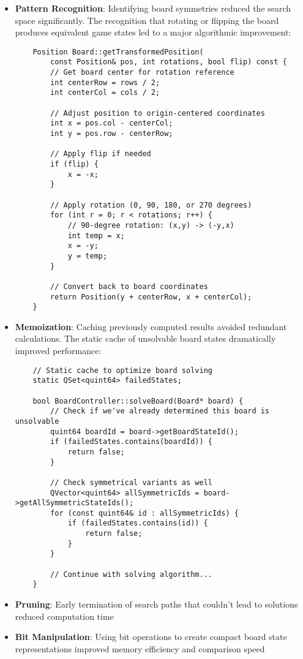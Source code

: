 \begin{itemize}
    \item \textbf{Pattern Recognition}: Identifying board symmetries reduced the search space significantly. The recognition that rotating or flipping the board produces equivalent game states led to a major algorithmic improvement:
    
    \begin{verbatim}
    Position Board::getTransformedPosition(
        const Position& pos, int rotations, bool flip) const {
        // Get board center for rotation reference
        int centerRow = rows / 2;
        int centerCol = cols / 2;
        
        // Adjust position to origin-centered coordinates
        int x = pos.col - centerCol;
        int y = pos.row - centerRow;
        
        // Apply flip if needed
        if (flip) {
            x = -x;
        }
        
        // Apply rotation (0, 90, 180, or 270 degrees)
        for (int r = 0; r < rotations; r++) {
            // 90-degree rotation: (x,y) -> (-y,x)
            int temp = x;
            x = -y;
            y = temp;
        }
        
        // Convert back to board coordinates
        return Position(y + centerRow, x + centerCol);
    }
    \end{verbatim}
    
    \item \textbf{Memoization}: Caching previously computed results avoided redundant calculations. The static cache of unsolvable board states dramatically improved performance:
    
    \begin{verbatim}
    // Static cache to optimize board solving
    static QSet<quint64> failedStates;
    
    bool BoardController::solveBoard(Board* board) {
        // Check if we've already determined this board is unsolvable
        quint64 boardId = board->getBoardStateId();
        if (failedStates.contains(boardId)) {
            return false;
        }
        
        // Check symmetrical variants as well
        QVector<quint64> allSymmetricIds = board->getAllSymmetricStateIds();
        for (const quint64& id : allSymmetricIds) {
            if (failedStates.contains(id)) {
                return false;
            }
        }
        
        // Continue with solving algorithm...
    }
    \end{verbatim}
    
    \item \textbf{Pruning}: Early termination of search paths that couldn't lead to solutions reduced computation time
    \item \textbf{Bit Manipulation}: Using bit operations to create compact board state representations improved memory efficiency and comparison speed
\end{itemize}

